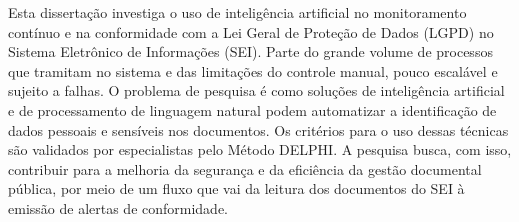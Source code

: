 
\begin{resumo}
Esta dissertação investiga o uso de inteligência artificial no monitoramento
contínuo e na conformidade com a Lei Geral de Proteção de Dados (LGPD) no
Sistema Eletrônico de Informações (SEI). Parte do grande volume de processos
que tramitam no sistema e das limitações do controle manual, pouco escalável e
sujeito a falhas. O problema de pesquisa é como soluções de inteligência
artificial e de processamento de linguagem natural podem automatizar a
identificação de dados pessoais e sensíveis nos documentos. Os critérios para o
uso dessas técnicas são validados por especialistas pelo Método DELPHI. A pesquisa busca,
com isso, contribuir para a melhoria da segurança e da eficiência da gestão
documental pública, por meio de um fluxo que vai da leitura dos documentos do
SEI à emissão de alertas de conformidade.
\end{resumo}
